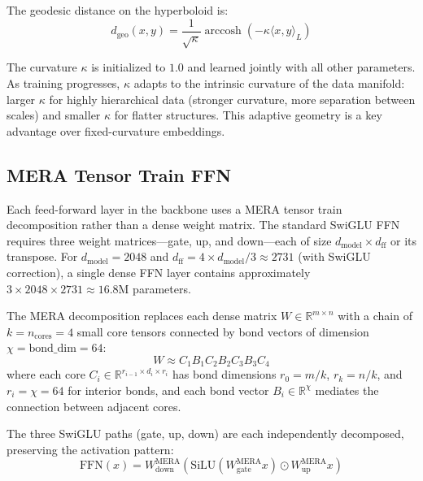 \documentclass[11pt,a4paper,twocolumn]{article}
\begin{document}
The geodesic distance on the hyperboloid is:
\begin{equation}
d_{\mathrm{geo}}(x, y) = \frac{1}{\sqrt{\kappa}} \operatorname{arccosh}(-\kappa \langle x, y \rangle_L)
\label{eq:geodesic}
\end{equation}

The curvature $\kappa$ is initialized to $1.0$ and learned jointly with all other parameters.
As training progresses, $\kappa$ adapts to the intrinsic curvature of the data manifold: larger $\kappa$ for highly hierarchical data (stronger curvature, more separation between scales) and smaller $\kappa$ for flatter structures.
This adaptive geometry is a key advantage over fixed-curvature embeddings.

\subsection{MERA Tensor Train FFN}

Each feed-forward layer in the backbone uses a MERA tensor train decomposition rather than a dense weight matrix.
The standard SwiGLU FFN requires three weight matrices---gate, up, and down---each of size $d_{\mathrm{model}} \times d_{\mathrm{ff}}$ or its transpose.
For $d_{\mathrm{model}} = 2048$ and $d_{\mathrm{ff}} = 4 \times d_{\mathrm{model}} / 3 \approx 2731$ (with SwiGLU correction), a single dense FFN layer contains approximately $3 \times 2048 \times 2731 \approx 16.8\mathrm{M}$ parameters.

The MERA decomposition replaces each dense matrix $W \in \mathbb{R}^{m \times n}$ with a chain of $k = n_{\mathrm{cores}} = 4$ small core tensors connected by bond vectors of dimension $\chi = \mathrm{bond\_dim} = 64$:
\begin{equation}
W \approx C_1 B_1 C_2 B_2 C_3 B_3 C_4
\label{eq:mera_decomp}
\end{equation}
where each core $C_i \in \mathbb{R}^{r_{i-1} \times d_i \times r_i}$ has bond dimensions $r_0 = m/k$, $r_k = n/k$, and $r_i = \chi = 64$ for interior bonds, and each bond vector $B_i \in \mathbb{R}^{\chi}$ mediates the connection between adjacent cores.

The three SwiGLU paths (gate, up, down) are each independently decomposed, preserving the activation pattern:
\begin{equation}
\mathrm{FFN}(x) = W_{\mathrm{down}}^{\mathrm{MERA}}\!\left(\mathrm{SiLU}(W_{\mathrm{gate}}^{\mathrm{MERA}} x) \odot W_{\mathrm{up}}^{\mathrm{MERA}} x\right)
\label{eq:swiglu}
\end{equation}
\end{document}
